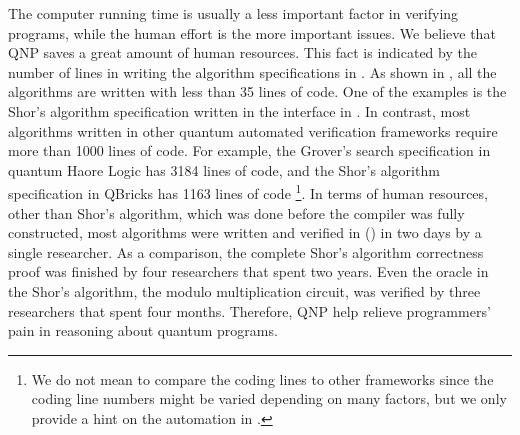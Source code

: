 The computer running time is usually a less important factor in verifying programs, while the human effort is the more important issues. We believe that QNP saves a great amount of human resources. This fact is indicated by the number of lines in writing the algorithm specifications in \qafny. As shown in , all the algorithms are written with less than 35 lines of code. One of the examples is the Shor's algorithm specification written in the \qafny interface in .
In contrast, most algorithms written in other quantum automated verification frameworks require more than 1000 lines of code.
For example, the Grover's search specification in quantum Haore Logic \cite{qhoreusage} has 3184 lines of code, and the Shor's algorithm specification in QBricks \cite{qbricks} has 1163 lines of code \footnote{We do not mean to compare the coding lines to other frameworks since the coding line numbers might be varied depending on many factors, but we only provide a hint on the automation in \qafny.}.
In terms of human resources, other than Shor's algorithm, which was done before the \qafny compiler was fully constructed, most algorithms were written and verified in \qafny () in two days by a single researcher. 
As a comparison, the complete Shor's algorithm correctness proof \cite{shorsprove} was finished by four researchers that spent two years. Even the oracle in the Shor's algorithm, the modulo multiplication circuit, was verified by three researchers that spent four months. Therefore, QNP help relieve programmers' pain in reasoning about quantum programs.

